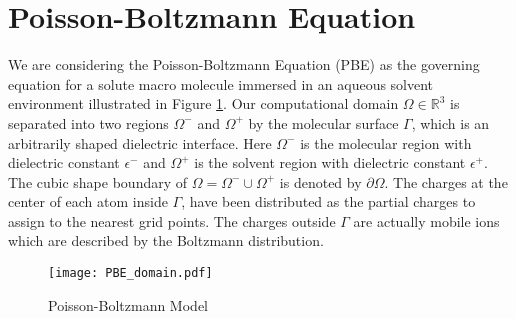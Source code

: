 \section{Poisson-Boltzmann Equation}
We are considering the Poisson-Boltzmann Equation (PBE) as the governing equation for a solute macro molecule immersed in an aqueous solvent environment illustrated in Figure \ref{fig_PBmodel}. Our computational domain $\Omega \in \mathbb{R}^3$ is separated into two regions $\Omega^-$ and $\Omega^+$ by the molecular surface $\Gamma$, which is an arbitrarily shaped dielectric interface. Here $\Omega^-$ is the molecular region with dielectric constant $\epsilon^-$ and $\Omega^+$ is the solvent region with dielectric constant $\epsilon^+$. The cubic shape boundary of $\Omega= \Omega^-\cup \Omega^+ $ is denoted by $\partial \Omega$. The charges at the center of each atom inside $\Gamma$, have been distributed as the partial charges to assign to the nearest grid points. The charges outside $\Gamma$ are actually mobile ions which are described by the Boltzmann distribution. 

\begin{figure}[!ht]
\centering
	\texttt{[image: PBE\_domain.pdf]}
	\caption{Poisson-Boltzmann Model}
	\label{fig_PBmodel}
\end{figure}

